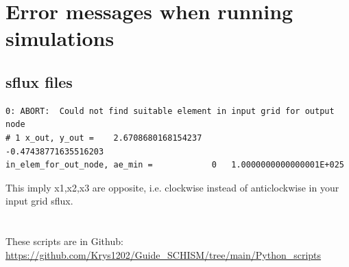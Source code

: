 \documentclass[preprints,briefreport,accept,oneauthor,pdftex]{Definitions/mdpi}
\begin{document}
\section{Error messages when running simulations}
\subsection{sflux files}
\begin{lstlisting}
0: ABORT:  Could not find suitable element in input grid for output node 
# 1 x_out, y_out =    2.6708680168154237
-0.47438771635516203      
in_elem_for_out_node, ae_min =            0   1.0000000000000001E+025  
\end{lstlisting}
This imply x1,x2,x3 are opposite, i.e. clockwise instead of anticlockwise in your input grid sflux.\\
\newline
\clearpage


\appendix
\section{}
These scripts are in Github: \url{https://github.com/Krys1202/Guide_SCHISM/tree/main/Python_scripts}
\unskip
\end{document}
